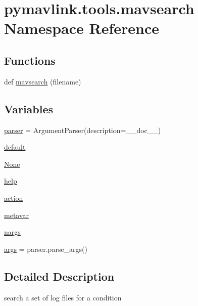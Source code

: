 \hypertarget{namespacepymavlink_1_1tools_1_1mavsearch}{}\section{pymavlink.\+tools.\+mavsearch Namespace Reference}
\label{namespacepymavlink_1_1tools_1_1mavsearch}
\subsection*{Functions}
\begin{DoxyCompactItemize}
\item 
def \mbox{\hyperlink{namespacepymavlink_1_1tools_1_1mavsearch_a9fe7f5e3fc4f4c97b0a96803b41173cd}{mavsearch}} (filename)
\end{DoxyCompactItemize}
\subsection*{Variables}
\begin{DoxyCompactItemize}
\item 
\mbox{\hyperlink{namespacepymavlink_1_1tools_1_1mavsearch_a1391d8703ddf1c8003e588947e33d99d}{parser}} = Argument\+Parser(description=\+\_\+\+\_\+doc\+\_\+\+\_\+)
\item 
\mbox{\hyperlink{namespacepymavlink_1_1tools_1_1mavsearch_a21b13250eb8051c96758a585ead2edef}{default}}
\item 
\mbox{\hyperlink{namespacepymavlink_1_1tools_1_1mavsearch_aa34c8e0d633cb457ef12fb58dc73fbd5}{None}}
\item 
\mbox{\hyperlink{namespacepymavlink_1_1tools_1_1mavsearch_a00d9dc61595eff776b8cc7e7b48fc3a6}{help}}
\item 
\mbox{\hyperlink{namespacepymavlink_1_1tools_1_1mavsearch_aafc3540805241f124474ef17234fe937}{action}}
\item 
\mbox{\hyperlink{namespacepymavlink_1_1tools_1_1mavsearch_ae80a7b25ed394368710d32ed5f9a94c1}{metavar}}
\item 
\mbox{\hyperlink{namespacepymavlink_1_1tools_1_1mavsearch_a16041845418a3432b66fc41f31cf166f}{nargs}}
\item 
\mbox{\hyperlink{namespacepymavlink_1_1tools_1_1mavsearch_a6cd138caa8603c5fbcccc7c0bd2bebfb}{args}} = parser.\+parse\+\_\+args()
\end{DoxyCompactItemize}


\subsection{Detailed Description}
\begin{DoxyVerb}search a set of log files for a condition
\end{DoxyVerb}
 

